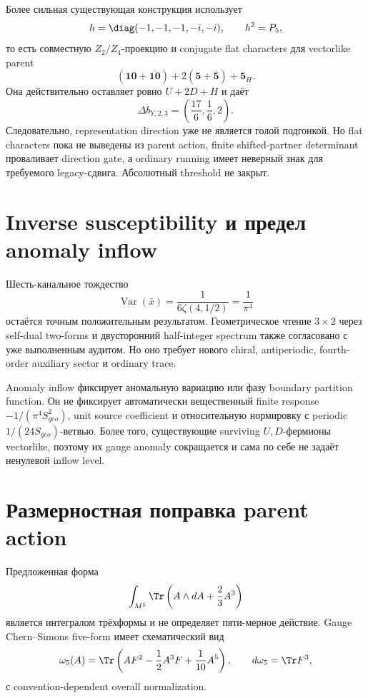 Более сильная существующая конструкция использует
\begin{equation}
 h=\diag(-1,-1,-1,-i,-i),\qquad h^2=P_5,
\end{equation}
то есть совместную \(Z_2/Z_4\)-проекцию и conjugate flat characters для
vectorlike parent
\begin{equation}
 (\mathbf{10}+\overline{\mathbf{10}})
 +2(\mathbf5+\overline{\mathbf5})+\mathbf5_H.
\end{equation}
Она действительно оставляет ровно \(U+2D+H\) и даёт
\begin{equation}
 \Delta b_{Y,2,3}=\left(\frac{17}{6},\frac16,2\right).
\end{equation}
Следовательно, representation direction уже не является голой подгонкой.
Но flat characters пока не выведены из parent action, finite shifted-partner
determinant проваливает direction gate, а ordinary running имеет неверный
знак для требуемого legacy-сдвига. Абсолютный threshold не закрыт.

\section{Inverse susceptibility и предел anomaly inflow}

Шесть-канальное тождество
\begin{equation}
 \operatorname{Var}(\bar x)
 =\frac1{6\zeta(4,1/2)}=\frac1{\pi^4}
\end{equation}
остаётся точным положительным результатом. Геометрическое чтение
\(3\times2\) через self-dual two-forms и двусторонний half-integer spectrum
также согласовано с уже выполненным аудитом. Но оно требует нового
chiral, antiperiodic, fourth-order auxiliary sector и ordinary trace.

Anomaly inflow фиксирует аномальную вариацию или фазу boundary partition
function. Он не фиксирует автоматически вещественный finite response
\(-1/(\pi^4S_{geo}^2)\), unit source coefficient и относительную нормировку
с periodic \(1/(24S_{geo})\)-ветвью. Более того, существующие surviving
\(U,D\)-фермионы vectorlike, поэтому их gauge anomaly сокращается и сама по
себе не задаёт ненулевой inflow level.

\section{Размерностная поправка parent action}

Предложенная форма
\begin{equation}
 \int_{M^5}\Tr\left(A\wedge dA+\frac23A^3\right)
\end{equation}
является интегралом трёхформы и не определяет пяти-мерное действие. Gauge
Chern--Simons five-form имеет схематический вид
\begin{equation}
 \omega_5(A)=\Tr\left(AF^2-\frac12A^3F+\frac1{10}A^5\right),
 \qquad d\omega_5=\Tr F^3,
\end{equation}
с convention-dependent overall normalization.

